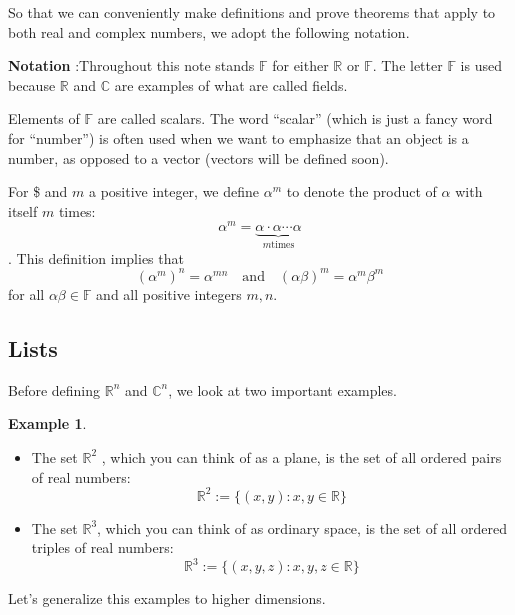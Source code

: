 \documentclass[
]{book}
\providecommand{\tightlist}{%
  \setlength{\itemsep}{0pt}\setlength{\parskip}{0pt}}
\theoremstyle{definition}
\theoremstyle{definition}
\newtheorem{example}{Example}[chapter]
\theoremstyle{definition}
\theoremstyle{definition}
\theoremstyle{remark}
\begin{document}
So that we can conveniently make definitions and prove theorems that apply to both real and complex numbers, we adopt the following notation.

\textbf{Notation} :Throughout this note stands \(\mathbb{F}\) for either \(\mathbb{R}\) or \(\mathbb{F}\). The letter \(\mathbb{F}\) is used because \(\mathbb{R}\) and \(\mathbb{C}\) are examples of what are called fields.

Elements of \(\mathbb{F}\) are called scalars. The word ``scalar'' (which is just a fancy word for ``number'') is often used when we want to emphasize that an object is a number, as opposed to a vector (vectors will be defined soon).

For \$\alpha \in {} and \(m\) a positive integer, we define \(\alpha^m\) to denote the product of \(\alpha\) with itself \(m\) times:
\[\alpha^m=\underbrace{\alpha\cdot \alpha \cdots \alpha}_{ m \text{times}}\].
This definition implies that
\[(\alpha^m)^n=\alpha^{mn}\quad \text {and} \quad(\alpha\beta)^m=\alpha^m\beta^m\]
for all \(\alpha\beta\in \mathbb{F}\) and all positive integers \(m,n\).

\subsection{Lists}\label{lists}

Before defining \(\mathbb{R}^n\) and \(\mathbb{C}^n\), we look at two important examples.

\begin{example}
\protect\hypertarget{exm:unnamed-chunk-6}{}\label{exm:unnamed-chunk-6}\leavevmode

\begin{itemize}
\tightlist
\item
  The set \(\mathbb{R}^2\) , which you can think of as a plane, is the set of all ordered pairs of real numbers:
  \[\mathbb{R}^2:=\{(x,y):x,y\in \mathbb{R}\}\]
\item
  The set \(\mathbb{R}^3\), which you can think of as ordinary space, is the set of all ordered triples of real numbers:
  \[\mathbb{R}^3:=\{(x,y,z):x,y,z\in \mathbb{R}\}\]
\end{itemize}

\end{example}

Let's generalize this examples to higher dimensions.
\end{document}
